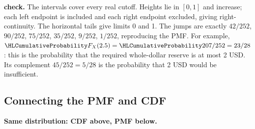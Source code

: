 \textbf{ check.} The intervals cover every real cutoff. Heights lie in $[0,1]$ and increase; each left endpoint is included and each right endpoint excluded, giving right-continuity. The horizontal tails give limits 0 and 1. The jumps are exactly $42/252$, $90/252$, $75/252$, $35/252$, $9/252$, $1/252$, reproducing the PMF. For example, $\cTwoCDFHL{F_X(2.5)}=\cTwoCDFHL{207/252}=23/28$: this is the probability that the required whole-dollar reserve is at most 2 USD. Its complement $45/252=5/28$ is the probability that 2 USD would be insufficient.
\clearpage
\subsection*{Connecting the PMF and CDF}
\textbf{Same distribution: CDF above, PMF below.}
